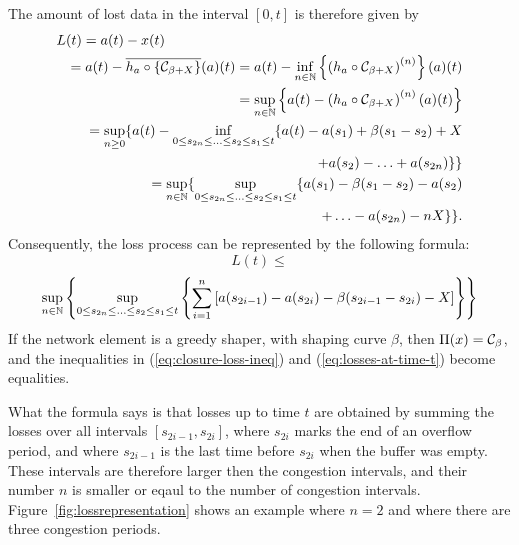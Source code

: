 The amount of lost data in the interval $[0,t]$ is therefore given by
\begin{eqnarray*}
\lefteqn{L(t) = a(t) - x(t)} \\
     &  & =a(t) - \overline{  h_{a} \circ \{ \calC_{\beta + X} \}}(a)(t) =
a(t) - \inf_{n \in \Nats} \left\{ \left( h_{a} \circ \calC_{\beta + X} \right)^{(n)} \right\}(a)(t) \nonumber \\
 & & =\sup_{n \in \Nats} \left\{ a(t) - \left( h_{a} \circ
\calC_{\beta + X} \right)^{(n)}(a)(t) \right\} \nonumber \\
 &  & = \sup_{n \geq 0} \{ a(t) - \inf_{0 \leq s_{2n} \leq \ldots
\leq s_2 \leq s_1 \leq t}
\{ a(t) - a(s_1) + \beta(s_1-s_2) + X \\
  & & \;\;\;\;\;\;\;\;\;\;\;\;\;\;\;\;\;\;\;\;  + a(s_2) - \ldots +
a(s_{2n}) \} \} \nonumber \\
 &  & = \sup_{n \in \Nats}   \{ \sup_{0 \leq s_{2n} \leq \ldots \leq
s_2 \leq s_1 \leq t}
 \{ a(s_1) - \beta(s_1-s_2) - a(s_2) \\
 & & + \ldots - a(s_{2n}) - nX
\} \}.
\end{eqnarray*}
Consequently, the loss process can be represented by the following
formula:
$$
 L(t) \leq
 $$
\begin{equation}
\sup_{n \in \Nats}  \left\{ \sup_{0 \leq s_{2n} \leq \ldots \leq
s_2 \leq s_1 \leq t}
  \left\{
  \sum_{i=1}^n \left[ a(s_{2i-1}) - a(s_{2i}) -
\beta(s_{2i-1}-s_{2i}) - X \right] \right\} \right\}
\mylabel{eq:losses-at-time-t}
\end{equation}
 If the network element is a greedy
shaper, with shaping curve $\beta$, then $\Pi(x) = \mathcal C_{\beta}$,
and the inequalities in (\ref{eq:closure-loss-ineq}) and
(\ref{eq:losses-at-time-t}) become equalities.

What the formula says is that losses up to time $t$ are obtained
by summing the losses over all intervals $[s_{2i-1},s_{2i}]$,
where $s_{2i}$ marks the end of an overflow period, and where $s_{2i-1}$ is the last time before $s_{2i}$ when the buffer was empty. These intervals are therefore larger then the congestion intervals, and their number $n$ is smaller or eqaul to the number of congestion intervals. Figure~\ref{fig:lossrepresentation} shows an example where $n = 2$ and where there are three congestion periods.

\begin{figure}[!h]
    \protect{}
\end{figure}

